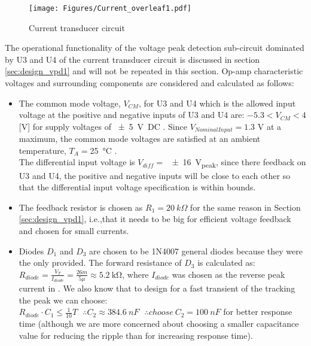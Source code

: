 \begin{figure}[H]
    \centering
    \texttt{[image: Figures/Current\_overleaf1.pdf]}
    \caption{Current transducer circuit}
    \label{fig:current_diag}
\end{figure}

The operational functionality of the voltage peak detection sub-circuit dominated by U3 and U4 of the current transducer circuit is discussed in section \ref{sec:design_vpd1} and will not be repeated in this section.
Op-amp characteristic voltages and surrounding components are considered and calculated as follows:
\begin{itemize}
 \item The common mode voltage, $V_{CM}$, for U3 and U4 which is the allowed input voltage at the positive and negative inputs of U3 and U4 are: $-5.3<V_{CM}<4$ [V] for supply voltages of \SI{+-5}{\volt DC} \cite{TLC2272}. Since $V_{Nominal Input}=1.3$ V at a maximum, the common mode voltages are satisfied at an ambient temperature, $T_A=$\SI{25}{\degreeCelsius} \cite{TLC2272}.\\The differential input voltage is $V_{diff}=$ \SI{+-16}{V_{peak}}, since there feedback on U3 and U4, the positive and negative inputs will be close to each other so that the differential input voltage specification is within bounds.
\item The feedback resistor is chosen as $R_1=20\ k\Omega$ for the same reason in Section \ref{sec:design_vpd1}, i.e.,that it needs to be big for efficient voltage feedback and chosen for small currents.
  \item Diodes $D_1$ and $D_3$ are chosen to be 1N4007 general diodes because they were the only provided. The forward resistance of $D_3$ is calculated as: $R_{diode}=\frac{V_T}{I_{diode}}=\frac{26m}{5\mu}\approx\SI{5.2}{\kilo\ohm}$, where $I_{diode}$ was chosen as the reverse peak current in
  \cite{1N4007}. We also know that to design for a fast transient of the tracking the peak we can choose\cite{voltage_peak_detector}: $R_{diode}\cdot C_1 \leq \frac{1}{10}T  \ \ \ \therefore C_2\approx384.6 \ nF \ \ \ \therefore choose \  C_2=100\ nF$ for better response time (although we are more concerned about choosing a smaller capacitance value for reducing the ripple than for increasing response time).
\end{itemize}

